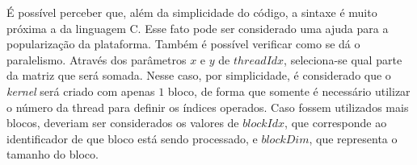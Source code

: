 \documentclass[cic,tc]{iiufrgs}
\newcommand{\reg}{\textsuperscript{\textregistered}}
\begin{document}
É possível perceber que, além da simplicidade do código, a sintaxe é muito próxima a
da linguagem C. 
Esse fato pode ser considerado uma ajuda para a popularização da plataforma.
Também é possível verificar como se dá o paralelismo. 
Através dos parâmetros $x$ e $y$ de $threadIdx$, seleciona-se qual parte da matriz que 
será somada. 
Nesse caso, por simplicidade, é considerado que o \textit{kernel} será criado com apenas
$1$ bloco, de forma que somente é necessário utilizar o número da thread para definir 
os índices operados.
Caso fossem utilizados mais blocos, deveriam ser considerados os valores de $blockIdx$, 
que corresponde ao identificador de que bloco está sendo processado, e $blockDim$, que 
representa o tamanho do bloco.

\end{document}
